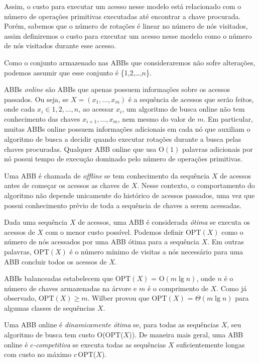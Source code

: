Assim, o custo para executar um acesso nesse modelo está relacionado com o número de operações primitivas executadas até encontrar a chave procurada. Porém, sabemos que o número de rotações é linear no número de nós visitados, assim definiremos o custo para executar um acesso nesse modelo como o número de nós visitados durante esse acesso.

Como o conjunto armazenado nas ABBs que consideraremos não sofre alterações, podemos assumir que esse conjunto é \{1,2,\ldots,$n$\}.

ABBs \textit{online} são ABBs que apenas possuem informações sobre os acessos passados. Ou seja, se $X = (x_1, \ldots, x_m)$ é a sequência de acessos que serão feitos, onde cada $x_i \in {1,2,\ldots,n}$, ao acessar $x_{i}$, um algoritmo de busca online não tem conhecimento das chaves $x_{i+1},\ldots,x_{m}$, nem mesmo do valor de $m$. Em particular, muitas ABBs online possuem informações adicionais em cada nó que auxiliam o algoritmo de busca a decidir quando executar rotações durante a busca pelas chaves procuradas. Qualquer ABB online que usa O$(1)$ palavras adicionais por nó possui tempo de execução dominado pelo número de operações primitivas.

Uma ABB é chamada de \textit{offline} se tem conhecimento da sequência $X$ de acessos antes de começar os acessos as chaves de $X$. Nesse contexto, o comportamento do algoritmo não depende unicamente do histórico de acessos passados, uma vez que possui conhecimento prévio de toda a sequência de chaves a serem acessadas.

Dada uma sequência $X$ de acessos, uma ABB é considerada \textit{ótima} se executa os acessos de $X$ com o menor custo possível. Podemos definir OPT$(X)$ como o número de nós acessados por uma ABB ótima para a sequência $X$. Em outras palavras, OPT$(X)$ é o número mínimo de visitas a nós necessário para uma ABB concluir todos os acessos de $X$. 

ABBs balanceadas estabelecem que OPT$(X)$ = O$(m \lg n)$, onde $n$ é o número de chaves armazenadas na árvore e $m$ é o comprimento de $X$. Como já observado, $\text{OPT}(X) \geq m$. Wilber \cite{lowerbound_wilbert} provou que OPT$(X)$ = $\Theta$$(m \lg n)$ para algumas classes de sequências $X$. 

Uma ABB online é \textit{dinamicamente ótima} se, para todas as sequências $X$, seu algoritmo de busca tem custo O(OPT($X$)). De maneira mais geral, uma ABB online é \textit{$c$-competitiva} se executa todas as sequências $X$ suficientemente longas com custo no máximo $c$\,OPT($X$).

